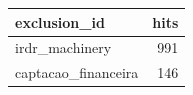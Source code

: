 \begin{table}[htbp]
\centering
\label{tab:dropped_by_exclusion}
\begin{tabular}{lr}
\toprule
exclusion\_id & hits \\
\midrule
irdr\_machinery & 991 \\
captacao\_financeira & 146 \\
\bottomrule
\end{tabular}
\end{table}
